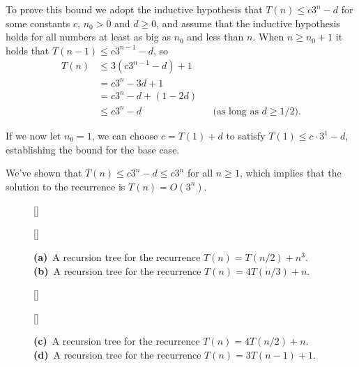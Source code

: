 To prove this bound we adopt the inductive hypothesis that $T(n)\le c3^n-d$ for some constants $c$, $n_0>0$ and $d\ge0$, and assume that the inductive hypothesis holds for all numbers at least as big as $n_0$ and less than $n$.
When $n\ge n_0+1$ it holds that $T(n-1)\le c3^{n-1}-d$, so
\begin{align*}
    T(n) &\le 3(c3^{n-1}-d)+1 \\
    &= c3^n-3d+1 \\
    &= c3^n-d+(1-2d) \\
    &\le c3^n-d && \text{(as long as $d\ge1/2$)}.
\end{align*}

If we now let $n_0=1$, we can choose $c=T(1)+d$ to satisfy $T(1)\le c\cdot3^1-d$, establishing the bound for the base case.

We've shown that $T(n)\le c3^n-d\le c3^n$ for all $n\ge1$, which implies that the solution to the recurrence is $T(n)=O(3^n)$.

\begin{figure}[!htb]
    \subcaptionbox{\label{fig:4.4-1a}}[\textwidth]{}
    \par\vspace{10mm}
    \subcaptionbox{\label{fig:4.4-1b}}[\textwidth]{}
    \caption{
        \textbf{(a)}\, A recursion tree for the recurrence $T(n)=T(n/2)+n^3$.\,
        \textbf{(b)}\, A recursion tree for the recurrence $T(n)=4T(n/3)+n$.
    } \label{fig:4.4-1}
\end{figure}

\begin{figure}[htb!]\ContinuedFloat
    \subcaptionbox{\label{fig:4.4-1c}}[\textwidth]{}
    \par\vspace{10mm}
    \subcaptionbox{\label{fig:4.4-1d}}[\textwidth]{}
    \caption{
        \textbf{(c)}\, A recursion tree for the recurrence $T(n)=4T(n/2)+n$.\,
        \textbf{(d)}\, A recursion tree for the recurrence $T(n)=3T(n-1)+1$.
    }
\end{figure}
